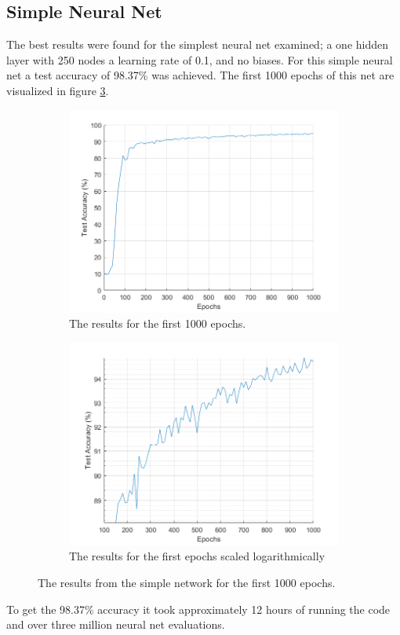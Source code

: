 \documentclass[12pt]{article}
\begin{document}
	\subsection{Simple Neural Net}
	The best results were found for the simplest neural net examined; a one hidden layer with 250 nodes a learning rate of 0.1, and no biases. For this simple neural net a test accuracy of 98.37\% was achieved. The first 1000 epochs of this net are visualized in figure \ref{fig:250_all}.
	\begin{figure}
		\centering
		\begin{subfigure}{.5\textwidth}
			\centering
			\includegraphics[width=\linewidth]{250_results}
			\caption{The results for the first 1000 epochs.}
			\label{fig:250results}
		\end{subfigure}%
		\begin{subfigure}{.5\textwidth}
			\centering
			\includegraphics[width=\linewidth]{250_results_log}
			\caption{The results for the first epochs scaled logarithmically}
			\label{fig:250resultslog}
		\end{subfigure}
		\caption{The results from the simple network for the first 1000 epochs.}
		\label{fig:250_all}
	\end{figure}
	To get the 98.37\% accuracy it took approximately 12 hours of running the code and over three million neural net evaluations.
	
\end{document}
